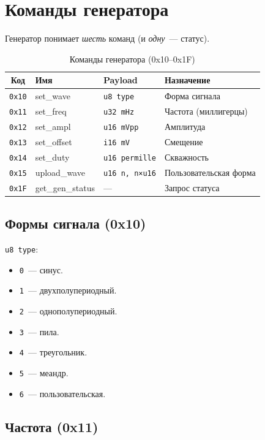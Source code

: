 \section{Команды генератора}
\label{sec:protocol-gen-cmds}

Генератор понимает \emph{шесть} команд (и \emph{одну}~--- статус).

\begin{table}[htbp]
\centering
\caption{Команды генератора (0x10–0x1F)}
\label{tab:protocol-gen-cmds}
\small
\begin{tabularx}{\textwidth}{@{}c l l L@{}}
\toprule
\textbf{Код} & \textbf{Имя} & \textbf{Payload} & \textbf{Назначение} \\
\midrule
\texttt{0x10} & set\_wave   & \texttt{u8 type} & Форма сигнала \\
\texttt{0x11} & set\_freq   & \texttt{u32 mHz} & Частота (миллигерцы) \\
\texttt{0x12} & set\_ampl   & \texttt{u16 mVpp} & Амплитуда \\
\texttt{0x13} & set\_offset & \texttt{i16 mV} & Смещение \\
\texttt{0x14} & set\_duty   & \texttt{u16 permille} & Скважность \\
\texttt{0x15} & upload\_wave & \texttt{u16 n, n×u16} & Пользовательская форма \\
\texttt{0x1F} & get\_gen\_status & --- & Запрос статуса \\
\bottomrule
\end{tabularx}
\end{table}

\subsection{Формы сигнала (0x10)}

\texttt{u8 type}:
\begin{itemize}
    \item \texttt{0}~--- синус.
    \item \texttt{1}~--- двухполупериодный.
    \item \texttt{2}~--- однополупериодный.
    \item \texttt{3}~--- пила.
    \item \texttt{4}~--- треугольник.
    \item \texttt{5}~--- меандр.
    \item \texttt{6}~--- пользовательская.
\end{itemize}

\subsection{Частота (0x11)}

